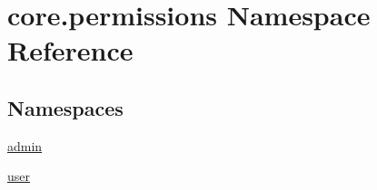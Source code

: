 \hypertarget{namespacecore_1_1permissions}{\section{core.\-permissions Namespace Reference}
\label{namespacecore_1_1permissions}
}
\subsection*{Namespaces}
\begin{DoxyCompactItemize}
\item 
\hyperlink{namespacecore_1_1permissions_1_1admin}{admin}
\item 
\hyperlink{namespacecore_1_1permissions_1_1user}{user}
\end{DoxyCompactItemize}
